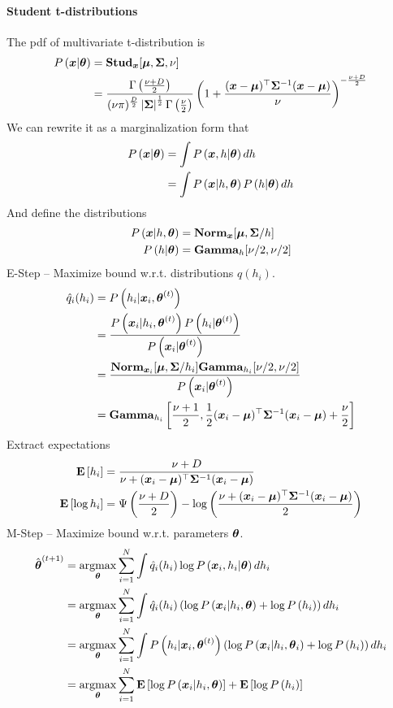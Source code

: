 \paragraph{Student t-distributions}

The pdf of multivariate t-distribution is
\begin{align*}
	P\left(\boldsymbol{x}|\boldsymbol{\theta}\right)&=\mathbf{Stud}_{\boldsymbol{x}}[\boldsymbol{\mu},\mathbf{\Sigma},\nu] \\
	&=\frac{\Gamma\left(\frac{\nu+D}{2}\right)}{(\nu\pi)^{\frac{D}{2}}\left\vert \mathbf{\Sigma} \right\vert^{\frac{1}{2}}\Gamma\left(\frac{\nu}{2}\right)}\left(1+\frac{(\boldsymbol{x}-\boldsymbol{\mu})^\top\mathbf{\Sigma}^{-1}(\boldsymbol{x}-\boldsymbol{\mu})}{\nu}\right)^{-\frac{\nu+D}{2}}
\end{align*}
We can rewrite it as a marginalization form that
\begin{align*}
	P\left(\boldsymbol{x}|\boldsymbol{\theta}\right)&=\int P\left(\boldsymbol{x},h|\boldsymbol{\theta}\right)dh \\
	&=\int P\left(\boldsymbol{x}|h,\boldsymbol{\theta}\right)P\left(h|\boldsymbol{\theta}\right)dh
\end{align*}
And define the distributions
\begin{align*}
	P\left(\boldsymbol{x}|h,\boldsymbol{\theta}\right)&=\mathbf{Norm}_{\boldsymbol{x}}[\boldsymbol{\mu},\mathbf{\Sigma}/h] \\
	P\left(h|\boldsymbol{\theta}\right)&=\mathbf{Gamma}_h[\nu/2,\nu/2]
\end{align*}
E-Step -- Maximize bound w.r.t. distributions $q(h_i)$.
\begin{align*}
	\hat{q}_i(h_i)&=P\left(h_i|\boldsymbol{x}_i,\boldsymbol{\theta}^{(t)}\right) \\
	&=\frac{P\left(\boldsymbol{x}_i|h_i,\boldsymbol{\theta}^{(t)}\right)P\left(h_i|\boldsymbol{\theta}^{(t)}\right)}{P\left(\boldsymbol{x}_i|\boldsymbol{\theta}^{(t)}\right)} \\
	&=\frac{\mathbf{Norm}_{\boldsymbol{x}_i}[\boldsymbol{\mu},\mathbf{\Sigma}/h_i]\mathbf{Gamma}_{h_i}[\nu/2,\nu/2]}{P\left(\boldsymbol{x}_i|\boldsymbol{\theta}^{(t)}\right)} \\
	&=\mathbf{Gamma}_{h_i}\left[\frac{\nu+1}{2},\frac{1}{2}(\boldsymbol{x}_i-\boldsymbol{\mu})^\top\mathbf{\Sigma}^{-1}(\boldsymbol{x}_i-\boldsymbol{\mu})+\frac{\nu}{2}\right]
\end{align*}
Extract expectations
\begin{align*}
	\mathbf{E}\left[h_i\right]&=\frac{\nu+D}{\nu+(\boldsymbol{x}_i-\boldsymbol{\mu})^\top\mathbf{\Sigma}^{-1}(\boldsymbol{x}_i-\boldsymbol{\mu})} \\
	\mathbf{E}\left[\log h_i\right]&=\Psi\left(\frac{\nu+D}{2}\right)-\log\left(\frac{\nu+(\boldsymbol{x}_i-\boldsymbol{\mu})^\top\mathbf{\Sigma}^{-1}(\boldsymbol{x}_i-\boldsymbol{\mu})}{2}\right)
\end{align*}
M-Step -- Maximize bound w.r.t. parameters $\boldsymbol{\theta}$.
\begin{align*}
	\hat{\vec{\th}}^{(t+1)}&=\argmax_{\vec{\th}}\sum_{i=1}^N\int\hat{q}_i(h_i)\log\P{\vec{x}_i,h_i|\vec{\th}}dh_i \\
	&=\argmax_{\vec{\th}}\sum_{i=1}^N\int\hat{q}_i(h_i)\left(\log\P{\vec{x}_i|h_i,\vec{\th}}+\log\P{h_i}\right)dh_i \\
	&=\argmax_{\vec{\th}}\sum_{i=1}^N\int\P{h_i|\vec{x}_i,\vec{\th}^{(t)}}\left(\log\P{\vec{x}_i|h_i,\vec{\th}_i}+\log\P{h_i}\right)dh_i \\
	&=\argmax_{\vec{\th}}\sum_{i=1}^N\E{\log\P{\vec{x}_i|h_i,\vec{\th}}}+\E{\log\P{h_i}}
\end{align*}
